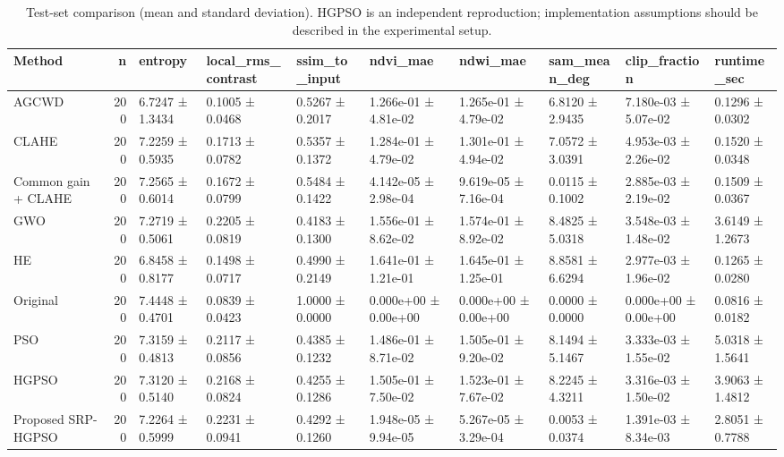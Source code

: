 \begin{table}
\caption{Test-set comparison (mean and standard deviation). HGPSO is an independent reproduction; implementation assumptions should be described in the experimental setup.}
\label{tab:main_results}
\begin{tabular}{lrllllllll}
\toprule
Method & n & entropy & local\_rms\_contrast & ssim\_to\_input & ndvi\_mae & ndwi\_mae & sam\_mean\_deg & clip\_fraction & runtime\_sec \\
\midrule
AGCWD & 200 & 6.7247 ± 1.3434 & 0.1005 ± 0.0468 & 0.5267 ± 0.2017 & 1.266e-01 ± 4.81e-02 & 1.265e-01 ± 4.79e-02 & 6.8120 ± 2.9435 & 7.180e-03 ± 5.07e-02 & 0.1296 ± 0.0302 \\
CLAHE & 200 & 7.2259 ± 0.5935 & 0.1713 ± 0.0782 & 0.5357 ± 0.1372 & 1.284e-01 ± 4.79e-02 & 1.301e-01 ± 4.94e-02 & 7.0572 ± 3.0391 & 4.953e-03 ± 2.26e-02 & 0.1520 ± 0.0348 \\
Common gain + CLAHE & 200 & 7.2565 ± 0.6014 & 0.1672 ± 0.0799 & 0.5484 ± 0.1422 & 4.142e-05 ± 2.98e-04 & 9.619e-05 ± 7.16e-04 & 0.0115 ± 0.1002 & 2.885e-03 ± 2.19e-02 & 0.1509 ± 0.0367 \\
GWO & 200 & 7.2719 ± 0.5061 & 0.2205 ± 0.0819 & 0.4183 ± 0.1300 & 1.556e-01 ± 8.62e-02 & 1.574e-01 ± 8.92e-02 & 8.4825 ± 5.0318 & 3.548e-03 ± 1.48e-02 & 3.6149 ± 1.2673 \\
HE & 200 & 6.8458 ± 0.8177 & 0.1498 ± 0.0717 & 0.4990 ± 0.2149 & 1.641e-01 ± 1.21e-01 & 1.645e-01 ± 1.25e-01 & 8.8581 ± 6.6294 & 2.977e-03 ± 1.96e-02 & 0.1265 ± 0.0280 \\
Original & 200 & 7.4448 ± 0.4701 & 0.0839 ± 0.0423 & 1.0000 ± 0.0000 & 0.000e+00 ± 0.00e+00 & 0.000e+00 ± 0.00e+00 & 0.0000 ± 0.0000 & 0.000e+00 ± 0.00e+00 & 0.0816 ± 0.0182 \\
PSO & 200 & 7.3159 ± 0.4813 & 0.2117 ± 0.0856 & 0.4385 ± 0.1232 & 1.486e-01 ± 8.71e-02 & 1.505e-01 ± 9.20e-02 & 8.1494 ± 5.1467 & 3.333e-03 ± 1.55e-02 & 5.0318 ± 1.5641 \\
HGPSO & 200 & 7.3120 ± 0.5140 & 0.2168 ± 0.0824 & 0.4255 ± 0.1286 & 1.505e-01 ± 7.50e-02 & 1.523e-01 ± 7.67e-02 & 8.2245 ± 4.3211 & 3.316e-03 ± 1.50e-02 & 3.9063 ± 1.4812 \\
Proposed SRP-HGPSO & 200 & 7.2264 ± 0.5999 & 0.2231 ± 0.0941 & 0.4292 ± 0.1260 & 1.948e-05 ± 9.94e-05 & 5.267e-05 ± 3.29e-04 & 0.0053 ± 0.0374 & 1.391e-03 ± 8.34e-03 & 2.8051 ± 0.7788 \\
\bottomrule
\end{tabular}
\end{table}

